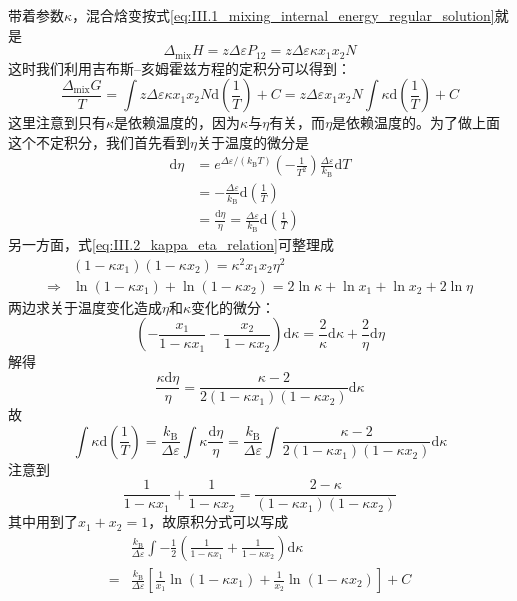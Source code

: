 \documentclass[main.tex]{subfiles}
\begin{document}
带着参数$\kappa$，混合焓变按式\eqref{eq:III.1_mixing_internal_energy_regular_solution}就是
\[\Delta_\text{mix}H=z\Delta\varepsilon P_{12}=z\Delta\varepsilon\kappa x_1x_2N\]
这时我们利用吉布斯--亥姆霍兹方程的定积分可以得到：
\[\frac{\Delta_\text{mix}G}{T}=\int z\Delta\varepsilon\kappa x_1x_2N\mathrm{d}\left(\frac{1}{T}\right)+C=z\Delta\varepsilon x_1 x_2 N\int\kappa\mathrm{d}\left(\frac{1}{T}\right)+C \]
这里注意到只有$\kappa$是依赖温度的，因为$\kappa$与$\eta$有关，而$\eta$是依赖温度的。为了做上面这个不定积分，我们首先看到$\eta$关于温度的微分是
\begin{align*}
  \mathrm{d}\eta & =e^{\Delta\varepsilon/\left(k_\text{B}T\right)}\left(-\frac{1}{T^2}\right)\frac{\Delta\varepsilon}{k_\text{B}}\mathrm{d}T \\&=-\frac{\Delta\varepsilon}{k_\text{B}}\mathrm{d}\left(\frac{1}{T}\right)\\&=\frac{\mathrm{d}\eta}{\eta}=\frac{\Delta\varepsilon}{k_\text{B}}\mathrm{d}\left(\frac{1}{T}\right)
\end{align*}
另一方面，式\eqref{eq:III.2_kappa_eta_relation}可整理成
\begin{align*}          & \left(1-\kappa x_1\right)\left(1-\kappa x_2\right)=\kappa^2x_1x_2\eta^2 \\\Rightarrow&\ln\left(1-\kappa x_1\right)+\ln\left(1-\kappa x_2\right)=2\ln\kappa+\ln x_1+\ln x_2+2\ln\eta
\end{align*}
两边求关于温度变化造成$\eta$和$\kappa$变化的微分：
\[\left(-\frac{x_1}{1-\kappa x_1}-\frac{x_2}{1-\kappa x_2}\right)\mathrm{d}\kappa=\frac{2}{\kappa}\mathrm{d}\kappa+\frac{2}{\eta}\mathrm{d}\eta\]
解得
\[\frac{\kappa\mathrm{d}\eta}{\eta}=\frac{\kappa-2}{2\left(1-\kappa x_1\right)\left(1-\kappa x_2\right)}\mathrm{d}\kappa\]
故
\[\int\kappa\mathrm{d}\left(\frac{1}{T}\right)=\frac{k_\text{B}}{\Delta\varepsilon}\int\kappa\frac{\mathrm{d}\eta}{\eta}=\frac{k_\text{B}}{\Delta\varepsilon}\int\frac{\kappa-2}{2\left(1-\kappa x_1\right)\left(1-\kappa x_2\right)}\mathrm{d}\kappa\]
注意到
\[\frac{1}{1-\kappa x_1}+\frac{1}{1-\kappa x_2}=\frac{2-\kappa}{\left(1-\kappa x_1\right)\left(1-\kappa x_2\right)}\]
其中用到了$x_1+x_2=1$，故原积分式可以写成
\begin{align*}
    & \frac{k_\text{B}}{\Delta\varepsilon}\int-\frac{1}{2}\left(\frac{1}{1-\kappa x_1}+\frac{1}{1-\kappa x_2}\right)\mathrm{d}\kappa         \\
  = & \frac{k_\text{B}}{\Delta\varepsilon}\left[\frac{1}{x_1}\ln\left(1-\kappa x_1\right)+\frac{1}{x_2}\ln\left(1-\kappa x_2\right)\right]+C
\end{align*}
\end{document}
